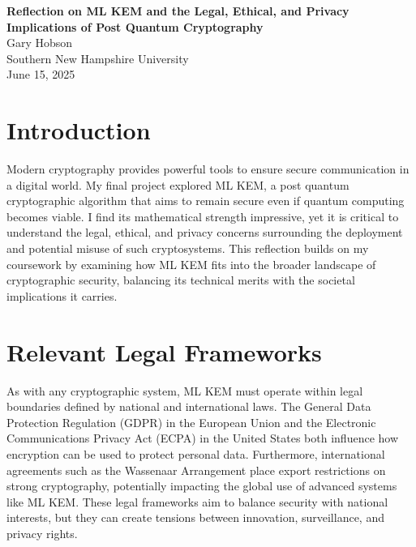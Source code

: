 \documentclass[12pt]{article}
\begin{document}
\begin{center}
    \textbf{\Large Reflection on ML KEM and the Legal, Ethical, and Privacy Implications of Post Quantum Cryptography} \\
    \vspace{0.5cm}
    Gary Hobson \\
    Southern New Hampshire University \\
    June 15, 2025
\end{center}

\thispagestyle{empty}

\clearpage

\section*{Introduction}
Modern cryptography provides powerful tools to ensure secure communication in a digital world. My final project explored ML KEM, a post quantum cryptographic algorithm that aims to remain secure even if quantum computing becomes viable. I find its mathematical strength impressive, yet it is critical to understand the legal, ethical, and privacy concerns surrounding the deployment and potential misuse of such cryptosystems. This reflection builds on my coursework by examining how ML KEM fits into the broader landscape of cryptographic security, balancing its technical merits with the societal implications it carries.

\section*{Relevant Legal Frameworks}
As with any cryptographic system, ML KEM must operate within legal boundaries defined by national and international laws. The General Data Protection Regulation (GDPR) in the European Union \cite{gdpr} and the Electronic Communications Privacy Act (ECPA) in the United States \cite{ecpa} both influence how encryption can be used to protect personal data. Furthermore, international agreements such as the Wassenaar Arrangement \cite{wassenaar} place export restrictions on strong cryptography, potentially impacting the global use of advanced systems like ML KEM. These legal frameworks aim to balance security with national interests, but they can create tensions between innovation, surveillance, and privacy rights.
\end{document}
